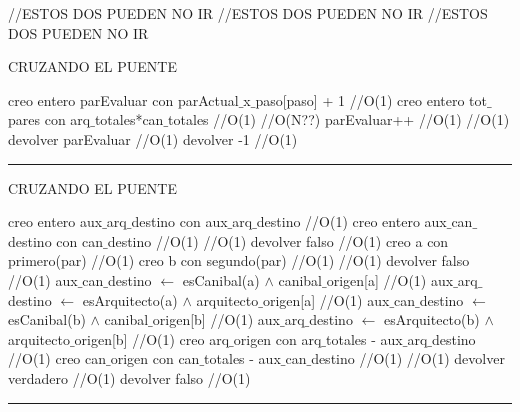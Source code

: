 //ESTOS DOS PUEDEN NO IR
//ESTOS DOS PUEDEN NO IR
//ESTOS DOS PUEDEN NO IR

\begin{algorithm}[H]
\caption{CRUZANDO EL PUENTE}
\begin{algorithmic}[1]
\state creo entero parEvaluar con parActual$\_$x$\_$paso[paso] + 1 \hfill //O(1)
\state creo entero tot$\_$pares con arq$\_$totales*can$\_$totales \hfill //O(1)
 \hfill //O(N??)
\state parEvaluar++ \hfill //O(1)
\endwhile
{} \hfill //O(1)
\state devolver  parEvaluar \hfill //O(1)
\Else
\state devolver -1 \hfill //O(1)
\endif
\EndFunction 
\end{algorithmic}
\hrule
{}
\end{algorithm}


\begin{algorithm}[H]
\caption{CRUZANDO EL PUENTE}
\begin{algorithmic}[1]
\state creo entero aux$\_$arq$\_$destino con aux$\_$arq$\_$destino \hfill //O(1)
\state creo entero aux$\_$can$\_$destino con can$\_$destino \hfill //O(1)
 \hfill //O(1)
\state devolver  falso \hfill //O(1)
\endif
\state creo a con primero(par) \hfill //O(1)
\state creo b con segundo(par) \hfill //O(1)
 \hfill //O(1)
\state devolver  falso \hfill //O(1)
\endif
\state aux$\_$can$\_$destino $\gets$  esCanibal(a) $\wedge$ canibal$\_$origen[a] \hfill //O(1)
\state aux$\_$arq$\_$destino $\gets$  esArquitecto(a) $\wedge$ arquitecto$\_$origen[a] \hfill //O(1)
\state aux$\_$can$\_$destino $\gets$  esCanibal(b) $\wedge$ canibal$\_$origen[b] \hfill //O(1)
\state aux$\_$arq$\_$destino $\gets$  esArquitecto(b) $\wedge$ arquitecto$\_$origen[b] \hfill //O(1)
\state creo arq$\_$origen con arq$\_$totales - aux$\_$arq$\_$destino \hfill //O(1)
\state creo can$\_$origen con can$\_$totales - aux$\_$can$\_$destino \hfill //O(1)
 \hfill //O(1)
\state devolver  verdadero \hfill //O(1)
\Else
\state devolver  falso \hfill //O(1)
\endif

\EndFunction 
\end{algorithmic}
\hrule
{}
\end{algorithm}

